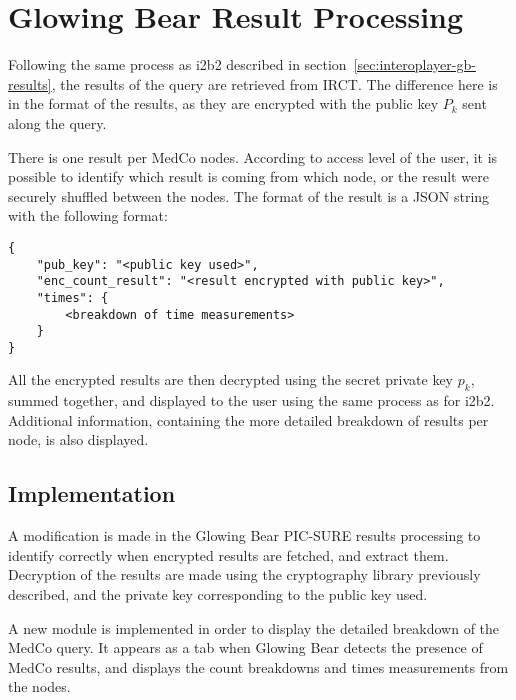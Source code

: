 



\section{Glowing Bear Result Processing}

Following the same process as i2b2 described in section~\ref{sec:interoplayer-gb-results}, the results of the query are retrieved from IRCT.
The difference here is in the format of the results, as they are encrypted with the public key $P_k$ sent along the query.

There is one result per MedCo nodes.
According to access level of the user, it is possible to identify which result is coming from which node, or the result were securely shuffled between the nodes.
The format of the result is a JSON string with the following format:

\begin{verbatim}
{
    "pub_key": "<public key used>",
    "enc_count_result": "<result encrypted with public key>",
    "times": {
        <breakdown of time measurements>
    }
}    
\end{verbatim}

All the encrypted results are then decrypted using the secret private key $p_k$, summed together, and displayed to the user using the same process as for i2b2.
Additional information, containing the more detailed breakdown of results per node, is also displayed.


\subsection*{Implementation}

A modification is made in the Glowing Bear PIC-SURE results processing to identify correctly when encrypted results are fetched, and extract them.
Decryption of the results are made using the cryptography library previously described, and the private key corresponding to the public key used.

A new module is implemented in order to display the detailed breakdown of the MedCo query.
It appears as a tab when Glowing Bear detects the presence of MedCo results, and displays the count breakdowns and times measurements from the nodes.
